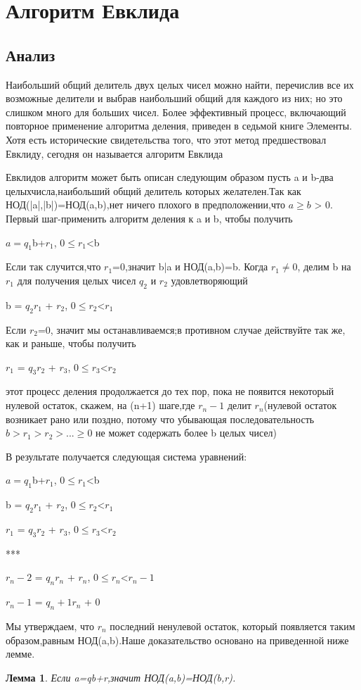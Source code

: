 \documentclass[11pt]{article}
\newtheorem{lemma}{Лемма}
\begin{document}
\section{Алгоритм Евклида}
\subsection{Анализ}
Наибольший общий делитель двух целых чисел можно найти, перечислив все их возможные делители и выбрав наибольший общий для каждого из них; но это слишком много для больших чисел. Более эффективный процесс, включающий повторное применение алгоритма деления, приведен в седьмой книге
Элементы.
Хотя есть исторические свидетельства того, что этот метод предшествовал Евклиду, сегодня он называется
алгоритм Евклида

 Евклидов алгоритм может быть описан следующим образом пусть a и b-два целыхчисла,наибольший общий делитель которых желателен.Так как НОД(|a|,|b|)=НОД(a,b),нет ничего плохого в предположении,что $a\ge b$ > 0.
 Первый шаг-применить алгоритм деления к a и b, чтобы получить
 \begin{center}
 	$a=q_1$b+$r_1$,	$0\le r_1$<b
 \end{center}
 Если так случится,что $r_1$=0,значит b|a и НОД(a,b)=b. Когда $r_1 \neq 0$,
 делим b на $r_1$ для получения целых чисел $q_2$ и $r_2$ удовлетворяющий
 \begin{center}
 	b = $q_2$$r_1$ + $r_2$, $0\le r_2$<$r_1$
 \end{center}
 Если $r_2$=0, значит мы останавливаемся;в противном случае действуйте так же, как и раньше, чтобы получить
 \begin{center}
 	$r_1$ = $q_3$$r_2$ + $r_3$, $0\le r_3$<$r_2$
 \end{center}
этот процесс деления продолжается до тех пор, пока не появится некоторый нулевой остаток, скажем, на (n+1) шаге,где $r_n-1$ делит $r_n$(нулевой остаток возникает рано или поздно, потому что убывающая последовательность $b > r_1 > r_2 > ... \ge 0$ не может содержать более b  целых чисел)

В результате получается следующая система уравнений:
\begin{center}
	$a=q_1$b+$r_1$,	$0\le r_1$<b
	
	b = $q_2$$r_1$ + $r_2$, $0\le r_2$<$r_1$
	
	$r_1$ = $q_3$$r_2$ + $r_3$, $0\le r_3$<$r_2$

    ***
    
    $r_n-2$ = $q_n$$r_n$ + $r_n$, $0\le r_n$<$r_n-1$
    
    $r_n-1$ = $q_n+1$$r_n$ + 0
\end{center}
Мы утверждаем, что $r_n$ последний ненулевой остаток, который появляется таким образом,равным НОД(a,b).Наше доказательство основано на приведенной ниже лемме.
\begin{lemma}
	Если a=qb+r,значит НОД(a,b)=НОД(b,r).
\end{lemma}
\cite{Burton}


\end{document}
